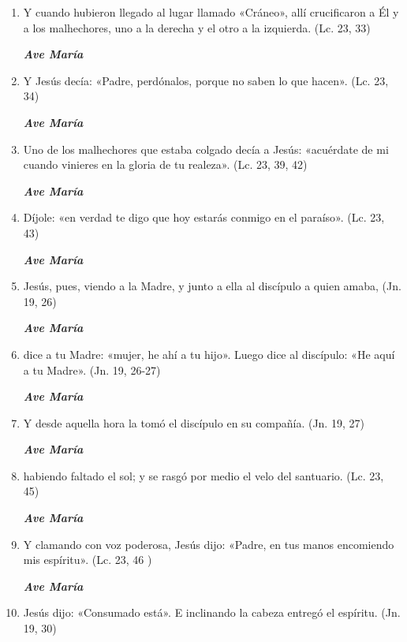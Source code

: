 \documentclass[a4paper,11pt, oneside]{report}
\begin{document}
      \begin{enumerate}
        
        \item Y cuando hubieron llegado al lugar llamado «Cráneo», allí crucificaron a Él y a los malhechores, uno a la derecha y el otro a la izquierda. (Lc. 23, 33)

        \textbf{\textit{Ave María}}

        \item Y Jesús decía: «Padre, perdónalos, porque no saben lo que hacen». (Lc. 23, 34)

        \textbf{\textit{Ave María}}

        \item Uno de los malhechores que estaba colgado decía a Jesús: «acuérdate de mi cuando vinieres en la gloria de tu realeza». (Lc. 23, 39, 42)

        \textbf{\textit{Ave María}}

        \item Díjole: «en verdad te digo que hoy estarás conmigo en el paraíso». (Lc. 23, 43)

        \textbf{\textit{Ave María}}

        \item Jesús, pues, viendo a la Madre, y junto a ella al discípulo a quien amaba, (Jn. 19, 26)

        \textbf{\textit{Ave María}}

        \item dice a tu Madre: «mujer, he ahí a tu hijo». Luego dice al discípulo: «He aquí a tu Madre». (Jn. 19, 26-27)

        \textbf{\textit{Ave María}}

        \item Y desde aquella hora la tomó el discípulo en su compañía. (Jn. 19, 27)

        \textbf{\textit{Ave María}}

        \item habiendo faltado el sol; y se rasgó por medio el velo del santuario. (Lc. 23, 45)

        \textbf{\textit{Ave María}}

        \item Y clamando con voz poderosa, Jesús dijo: «Padre, en tus manos encomiendo mis espíritu». (Lc. 23, 46 )

        \textbf{\textit{Ave María}}

        \item Jesús dijo: «Consumado está». E inclinando la cabeza entregó el espíritu. (Jn. 19, 30)

      \end{enumerate}
\end{document}
